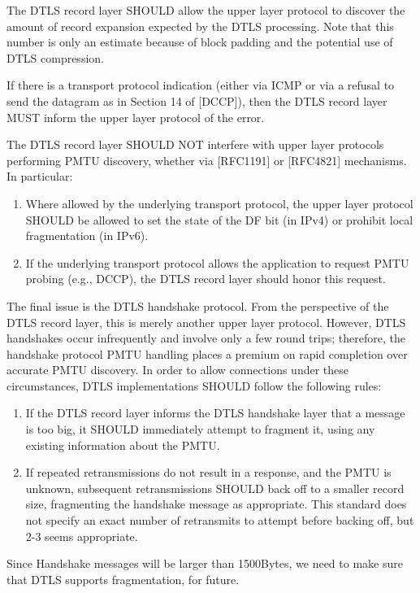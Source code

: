The DTLS record layer SHOULD allow the upper layer protocol to discover the amount of record expansion expected by the DTLS processing.  Note that this number is only an estimate because of block padding and the potential use of DTLS compression.

If there is a transport protocol indication (either via ICMP or via a refusal to send the datagram as in Section 14 of [DCCP]), then the DTLS record layer MUST inform the upper layer protocol of the error.

The DTLS record layer SHOULD NOT interfere with upper layer protocols performing PMTU discovery, whether via [RFC1191] or [RFC4821] mechanisms.  In particular:\\
\begin{enumerate}
    \item Where allowed by the underlying transport protocol, the upper
      layer protocol SHOULD be allowed to set the state of the DF bit
      (in IPv4) or prohibit local fragmentation (in IPv6).
     \item If the underlying transport protocol allows the application to request PMTU probing (e.g., DCCP), the DTLS record layer should honor this request.
\end{enumerate}{}


The final issue is the DTLS handshake protocol.  From the perspective of the DTLS record layer, this is merely another upper layer protocol.  However, DTLS handshakes occur infrequently and involve only a few round trips; therefore, the handshake protocol PMTU
handling places a premium on rapid completion over accurate PMTU discovery.  In order to allow connections under these circumstances, DTLS implementations SHOULD follow the following rules:
\begin{enumerate}
    \item If the DTLS record layer informs the DTLS handshake layer that a message is too big, it SHOULD immediately attempt to fragment it, using any existing information about the PMTU.
    \item If repeated retransmissions do not result in a response, and the PMTU is unknown, subsequent retransmissions SHOULD back off to a smaller record size, fragmenting the handshake message as appropriate.  This standard does not specify an exact number of retransmits to attempt before backing off, but 2-3 seems appropriate.
\end{enumerate}{}

Since Handshake messages will be larger than 1500Bytes, we need to make sure that DTLS supports fragmentation, for future.

